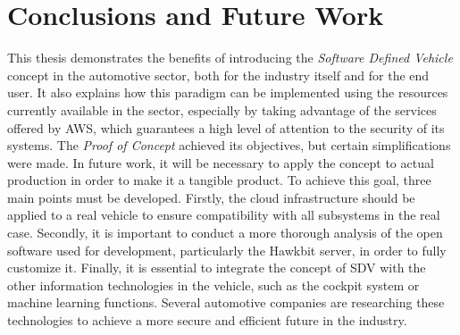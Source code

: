 \documentclass[10pt,a4paper,roman, twocolumn]{article}
\begin{document}
\section{Conclusions and Future Work}
This thesis demonstrates the benefits of introducing the \textit{Software Defined Vehicle} concept in the automotive sector, both for the industry itself and for the end user. It also explains how this paradigm can be implemented using the resources currently available in the sector, especially by taking advantage of the services offered by AWS, which guarantees a high level of attention to the security of its systems.
The \textit{Proof of Concept} achieved its objectives, but certain simplifications were made. In future work, it will be necessary to apply the concept to actual production in order to make it a tangible product. To achieve this goal, three main points must be developed. Firstly, the cloud infrastructure should be applied to a real vehicle to ensure compatibility with all subsystems in the real case. Secondly, it is important to conduct a more thorough analysis of the open software used for development, particularly the Hawkbit server, in order to fully customize it. Finally, it is essential to integrate the concept of SDV with the other information technologies in the vehicle, such as the cockpit system or machine learning functions. Several automotive companies are researching these technologies to achieve a more secure and efficient future in the industry.
	 
\end{document}
